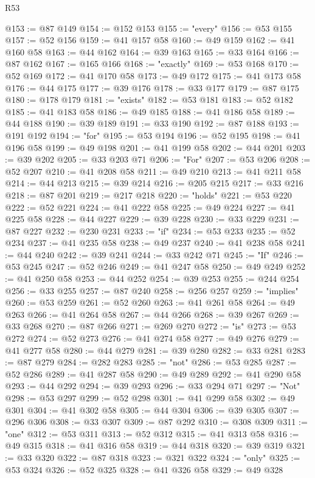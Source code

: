 \begin{lexlean}{R53}
\begin{coremodule}
@153 := @87 @149
@154 := @152 @153
@155 := "every"
@156 := @53 @155
@157 := @52 @156
@159 := @41 @157 @58
@160 := @49 @159
@162 := @41 @160 @58
@163 := @44 @162
@164 := @39 @163
@165 := @33 @164
@166 := @87 @162
@167 := @165 @166
@168 := "exactly"
@169 := @53 @168
@170 := @52 @169
@172 := @41 @170 @58
@173 := @49 @172
@175 := @41 @173 @58
@176 := @44 @175
@177 := @39 @176
@178 := @33 @177
@179 := @87 @175
@180 := @178 @179
@181 := "exists"
@182 := @53 @181
@183 := @52 @182
@185 := @41 @183 @58
@186 := @49 @185
@188 := @41 @186 @58
@189 := @44 @188
@190 := @39 @189
@191 := @33 @190
@192 := @87 @188
@193 := @191 @192
@194 := "for"
@195 := @53 @194
@196 := @52 @195
@198 := @41 @196 @58
@199 := @49 @198
@201 := @41 @199 @58
@202 := @44 @201
@203 := @39 @202
@205 := @33 @203 @71
@206 := "For"
@207 := @53 @206
@208 := @52 @207
@210 := @41 @208 @58
@211 := @49 @210
@213 := @41 @211 @58
@214 := @44 @213
@215 := @39 @214
@216 := @205 @215
@217 := @33 @216
@218 := @87 @201
@219 := @217 @218
@220 := "holds"
@221 := @53 @220
@222 := @52 @221
@224 := @41 @222 @58
@225 := @49 @224
@227 := @41 @225 @58
@228 := @44 @227
@229 := @39 @228
@230 := @33 @229
@231 := @87 @227
@232 := @230 @231
@233 := "if"
@234 := @53 @233
@235 := @52 @234
@237 := @41 @235 @58
@238 := @49 @237
@240 := @41 @238 @58
@241 := @44 @240
@242 := @39 @241
@244 := @33 @242 @71
@245 := "If"
@246 := @53 @245
@247 := @52 @246
@249 := @41 @247 @58
@250 := @49 @249
@252 := @41 @250 @58
@253 := @44 @252
@254 := @39 @253
@255 := @244 @254
@256 := @33 @255
@257 := @87 @240
@258 := @256 @257
@259 := "implies"
@260 := @53 @259
@261 := @52 @260
@263 := @41 @261 @58
@264 := @49 @263
@266 := @41 @264 @58
@267 := @44 @266
@268 := @39 @267
@269 := @33 @268
@270 := @87 @266
@271 := @269 @270
@272 := "is"
@273 := @53 @272
@274 := @52 @273
@276 := @41 @274 @58
@277 := @49 @276
@279 := @41 @277 @58
@280 := @44 @279
@281 := @39 @280
@282 := @33 @281
@283 := @87 @279
@284 := @282 @283
@285 := "not"
@286 := @53 @285
@287 := @52 @286
@289 := @41 @287 @58
@290 := @49 @289
@292 := @41 @290 @58
@293 := @44 @292
@294 := @39 @293
@296 := @33 @294 @71
@297 := "Not"
@298 := @53 @297
@299 := @52 @298
@301 := @41 @299 @58
@302 := @49 @301
@304 := @41 @302 @58
@305 := @44 @304
@306 := @39 @305
@307 := @296 @306
@308 := @33 @307
@309 := @87 @292
@310 := @308 @309
@311 := "one"
@312 := @53 @311
@313 := @52 @312
@315 := @41 @313 @58
@316 := @49 @315
@318 := @41 @316 @58
@319 := @44 @318
@320 := @39 @319
@321 := @33 @320
@322 := @87 @318
@323 := @321 @322
@324 := "only"
@325 := @53 @324
@326 := @52 @325
@328 := @41 @326 @58
@329 := @49 @328

\end{coremodule}
\end{lexlean}
